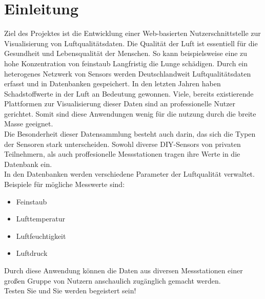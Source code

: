 \section{Einleitung}

Ziel des Projektes ist die Entwicklung einer Web-basierten Nutzerschnittstelle zur Visualisierung von Luftqualitätsdaten.
Die Qualität der Luft ist essentiell für die Gesundheit und Lebensqualität der Menschen. So kann beispielsweise eine zu hohe Konzentration von feinstaub Langfristig die Lunge schädigen. Durch ein heterogenes Netzwerk von \glspl{Sensor} werden Deutschlandweit Luftqualitätsdaten erfasst und in Datenbanken gespeichert.
In den letzten Jahren haben Schadstoffwerte in der Luft an Bedeutung gewonnen.
Viele, bereits existierende Plattformen zur Visualisierung dieser Daten sind an professionelle Nutzer gerichtet. Somit sind diese Anwendungen wenig für die nutzung durch die breite Masse geeignet.
\\
Die Besonderheit dieser Datensammlung besteht auch darin, das sich die Typen der Sensoren stark unterscheiden. Sowohl diverse \gls{DIY}-\glspl{Sensor} von privaten Teilnehmern, als auch proffesionelle Messstationen tragen ihre Werte in die Datenbank ein. 
\\
In den Datenbanken werden verschiedene Parameter der Luftqualität verwaltet. Beispiele für mögliche Messwerte sind:
\begin{itemize} [noitemsep]
    \item \gls{Feinstaub}
    \item Lufttemperatur
    \item Luftfeuchtigkeit
    \item Luftdruck
\end{itemize}
Durch diese Anwendung können die Daten aus diversen Messstationen einer großen Gruppe von Nutzern anschaulich zugänglich gemacht werden.\\
Testen Sie \softwarename und Sie werden begeistert sein!